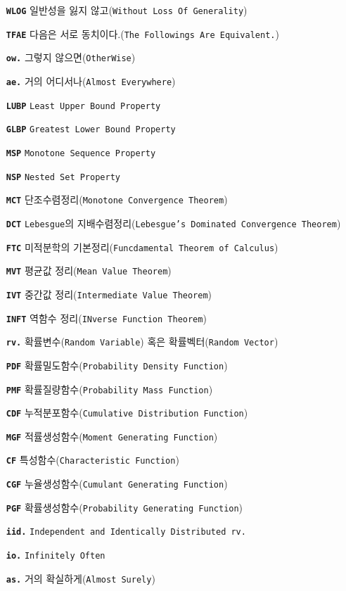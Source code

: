 \documentclass[graybox,envcountchap,envcountsame,sectrefs,fleqn]{svmono}
\begin{document}
\begin{itemize}
    \item[\texttt{\textbf{WLOG}}]{일반성을 잃지 않고(\texttt{Without Loss Of Generality})}
    \item[\texttt{\textbf{TFAE}}]{다음은 서로 동치이다.(\texttt{The Followings Are Equivalent.})}
    \item[\texttt{\textbf{ow.}}]{그렇지 않으면(\texttt{OtherWise})}
    \item[\texttt{\textbf{ae.}}]{거의 어디서나(\texttt{Almost Everywhere})}
    \item[\texttt{\textbf{LUBP}}]{\texttt{Least Upper Bound Property}}
    \item[\texttt{\textbf{GLBP}}]{\texttt{Greatest Lower Bound Property}}
    \item[\texttt{\textbf{MSP}}]{\texttt{Monotone Sequence Property}}
    \item[\texttt{\textbf{NSP}}]{\texttt{Nested Set Property}} 
    \item[\texttt{\textbf{MCT}}]{단조수렴정리(\texttt{Monotone Convergence Theorem})}
    \item[\texttt{\textbf{DCT}}]{\texttt{Lebesgue}의 지배수렴정리(\texttt{Lebesgue's Dominated Convergence Theorem})}
    \item[\texttt{\textbf{FTC}}]{미적분학의 기본정리(\texttt{Funcdamental Theorem of Calculus})}
    \item[\texttt{\textbf{MVT}}]{평균값 정리(\texttt{Mean Value Theorem})}
    \item[\texttt{\textbf{IVT}}]{중간값 정리(\texttt{Intermediate Value Theorem})}
    \item[\texttt{\textbf{INFT}}]{역함수 정리(\texttt{INverse Function Theorem})}
    \item[\texttt{\textbf{rv.}}]{확률변수(\texttt{Random Variable}) 혹은 확률벡터(\texttt{Random Vector})}
    \item[\texttt{\textbf{PDF}}]{확률밀도함수(\texttt{Probability Density Function})}
    \item[\texttt{\textbf{PMF}}]{확률질량함수(\texttt{Probability Mass Function})}
    \item[\texttt{\textbf{CDF}}]{누적분포함수(\texttt{Cumulative Distribution Function})}
    \item[\texttt{\textbf{MGF}}]{적률생성함수(\texttt{Moment Generating Function})}
    \item[\texttt{\textbf{CF}}]{특성함수(\texttt{Characteristic Function})}
    \item[\texttt{\textbf{CGF}}]{누율생성함수(\texttt{Cumulant Generating Function})}
    \item[\texttt{\textbf{PGF}}]{확률생성함수(\texttt{Probability Generating Function})}
    \item[\texttt{\textbf{iid.}}]{\texttt{Independent and Identically Distributed rv.}}
    \item[\texttt{\textbf{io.}}]{\texttt{Infinitely Often}}
    \item[\texttt{\textbf{as.}}]{거의 확실하게(\texttt{Almost Surely})}
\end{itemize}
\end{document}
